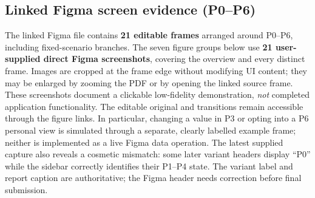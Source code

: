 \documentclass[12pt,a4paper]{article}
\begin{document}
\subsection{Linked Figma screen evidence (P0--P6)}
The linked Figma file contains \textbf{21 editable frames} arranged around P0--P6, including fixed-scenario branches. The seven figure groups below use \textbf{21 user-supplied direct Figma screenshots}, covering the overview and every distinct frame. Images are cropped at the frame edge without modifying UI content; they may be enlarged by zooming the PDF or by opening the linked source frame. These screenshots document a clickable low-fidelity demonstration, \emph{not} completed application functionality. The editable original and transitions remain accessible through the figure links.
In particular, changing a value in P3 or opting into a P6 personal view is simulated through a separate, clearly labelled example frame; neither is implemented as a live Figma data operation. The latest supplied capture also reveals a cosmetic mismatch: some later variant headers display ``P0'' while the sidebar correctly identifies their P1--P4 state. The variant label and report caption are authoritative; the Figma header needs correction before final submission.
\end{document}
